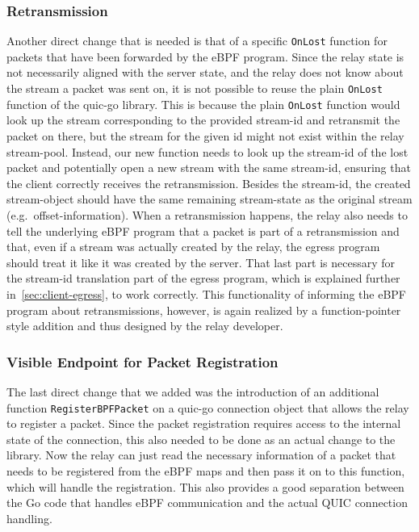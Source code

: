 \subsubsection*{Retransmission}
Another direct change that is needed is that of a specific \verb|OnLost| function for packets that 
have been forwarded by the eBPF program.
Since the relay state is not necessarily aligned with the server state, and the relay does not know
about the stream a packet was sent on, it is not possible to reuse the plain \verb|OnLost| function
of the quic-go library.
This is because the plain \verb|OnLost| function would look up the stream corresponding to the provided stream-id and 
retransmit the packet on there, but the stream for the given id might not exist within the relay stream-pool.
Instead, our new function needs to look up the stream-id of the lost packet and potentially open a new stream with
the same stream-id, ensuring that the client correctly receives the retransmission.
Besides the stream-id, the created stream-object should have the same remaining stream-state
as the original stream (e.g.~offset-information).  
When a retransmission happens, the relay also needs to tell the underlying eBPF program that a packet is part of a 
retransmission and that, even if a stream was actually created by the relay, the egress program should treat it like 
it was created by the server.
That last part is necessary for the stream-id translation part of the egress program, which is explained further
in~\autoref{sec:client-egress}, to work correctly.
This functionality of informing the eBPF program about retransmissions, however, is again realized by a 
function-pointer style addition and thus designed by the relay developer.

\subsubsection*{Visible Endpoint for Packet Registration}
The last direct change that we added was the introduction of an additional function \verb|RegisterBPFPacket| 
on a quic-go connection object that allows the relay to register a packet.
Since the packet registration requires access to the internal state of the connection, this also needed to be 
done as an actual change to the library.
Now the relay can just read the necessary information of a packet that needs to be registered
from the eBPF maps and then pass it on to this function, which will handle the registration.
This also provides a good separation between the Go code that handles eBPF communication and the actual
QUIC connection handling.